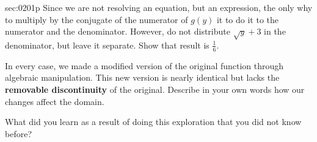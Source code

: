 \begin{multicols*}{2}
\begin{exercises}{sec:0201p}
\vspace{1cm}
\lab{} Since we are not resolving an equation, but an expression, the only why to multiply by the 
conjugate of the numerator of $g(y)$ it to do it to the numerator and the denominator.  However,
do not distribute $\sqrt{y}+3$ in the denominator, but leave it separate.  Show that result is
$\frac{1}{6}$.

\vspace{2cm}
\lab{}  In every case, we made a modified version of the original function through 
algebraic manipulation.  This new version is nearly identical but lacks the 
\textbf{removable discontinuity} of the original. Describe in your own words how our 
changes affect the domain.

\vspace{3cm}
\lab{} What did you learn as a result of doing this exploration that you did not know before?

\end{exercises}
\end{multicols*}